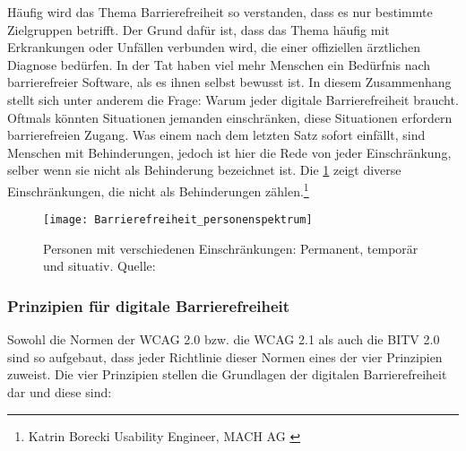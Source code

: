 Häufig wird das Thema Barrierefreiheit so verstanden, dass es nur bestimmte Zielgruppen betrifft. Der Grund dafür ist, dass das Thema häufig mit Erkrankungen oder Unfällen verbunden wird, die einer offiziellen ärztlichen Diagnose bedürfen. In der Tat haben viel mehr Menschen ein Bedürfnis nach barrierefreier Software, als es ihnen selbst bewusst ist. In diesem Zusammenhang stellt sich unter anderem die Frage: Warum jeder digitale Barrierefreiheit braucht. Oftmals könnten Situationen jemanden einschränken, diese Situationen erfordern barrierefreien Zugang. Was einem nach dem letzten Satz sofort einfällt, sind Menschen mit Behinderungen, jedoch ist hier die Rede von jeder Einschränkung, selber wenn sie nicht als Behinderung bezeichnet ist. Die \cref{fig:Beispielhafte Einschränkungen} zeigt diverse Einschränkungen, die nicht als Behinderungen zählen.\footnote{Katrin Borecki Usability Engineer, MACH AG \cite{mach}}

\begin{figure}[H]
	\centering
	\texttt{[image: Barrierefreiheit\_personenspektrum]}
	\caption[Personen mit verschiedenen Einschränkungen: Permanent, temporär und situativ]{Personen mit verschiedenen Einschränkungen: Permanent, temporär und situativ. 
	 Quelle: \cite{mach}}
	\label{fig:Beispielhafte Einschränkungen}
\end{figure}

\subsubsection{Prinzipien für digitale Barrierefreiheit}
\label{subsec:Prinzipien fuer Barrierefreiheit}

Sowohl die Normen der \ac{WCAG} 2.0 bzw. die \ac{WCAG} 2.1 als auch die \ac{BITV} 2.0 sind so aufgebaut, dass jeder Richtlinie dieser Normen eines der vier Prinzipien zuweist. Die vier Prinzipien stellen die Grundlagen der digitalen Barrierefreiheit dar und diese sind:


